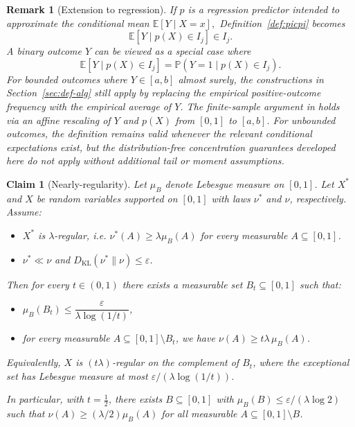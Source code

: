 \documentclass[11pt]{article}
\theoremstyle{statplain}
\newtheorem{claim}[theorem]{Claim}
\theoremstyle{statdefinition}
\newtheorem{remark}[theorem]{Remark}
\newcommand{\0}{\mathbf{0}}
\begin{document}
\begin{remark}[Extension to regression] 
\label{rmk:extension_regression}
If $p$ is a regression predictor intended to approximate the conditional mean
$
\mathbb{E}[Y\mid X=x],
$ Definition~\ref{def:picpi} becomes 
\[
\mathbb{E}\!\left[Y\mid p(X)\in I_j\right]\in I_j.
\]
A binary outcome $Y$ can be viewed as a special case where
\[
\mathbb{E}\!\left[Y\mid p(X)\in I_j\right]
=
\mathbb{P}\!\left(Y=1\mid p(X)\in I_j\right).
\]
For bounded outcomes where $Y\in [a,b]$ almost surely, the constructions in Section~\ref{sec:def-alg} still apply by replacing the empirical positive-outcome frequency with the empirical average of $Y$.
The finite-sample argument in  holds via an affine rescaling of $Y$ and $p(X)$ from $[0,1]$ to $[a,b]$. For unbounded outcomes, the definition remains valid whenever the relevant
conditional expectations exist, but the distribution-free concentration
guarantees developed here do not apply without additional tail or moment assumptions. 
\end{remark}



\iffalse
\begin{claim}[Nearly-regularity]
\label{cla:kl-regularity}
Let $\mu_B$ denote Lebesgue measure on $[0,1]$. Let $X^*$ and $X$ be random variables supported on $[0,1]$ with laws $\nu^*$ and $\nu$, respectively. Assume:
\begin{itemize}
  \item $X^*$ is $\lambda$-regular, i.e. $\nu^*(A) \ge \lambda \mu_B(A)$ for every measurable $A\subseteq[0,1]$.
  \item $\nu^*\ll \nu$ and $D_{\mathrm{KL}}(\nu^*\|\nu)\le \varepsilon$.
\end{itemize}
Then for every $t\in(0,1)$ there exists a measurable set $B_t\subseteq[0,1]$ such that:
\begin{itemize}
  \item $\mu_B(B_t)\le \dfrac{\varepsilon}{\lambda \log(1/t)}$,
  \item for every measurable $A\subseteq [0,1]\setminus B_t$, we have $\nu(A)\ge t\lambda\,\mu_B(A)$.
\end{itemize}
Equivalently, $X$ is $(t\lambda)$-regular on the complement of $B_t$, where the exceptional set has Lebesgue measure at most $\varepsilon/(\lambda\log(1/t))$.

In particular, with $t=\tfrac12$, there exists $B\subseteq[0,1]$ with $\mu_B(B)\le \varepsilon/(\lambda\log 2)$ such that $\nu(A)\ge (\lambda/2)\mu_B(A)$ for all measurable $A\subseteq[0,1]\setminus B$.
\end{claim}
\end{document}

